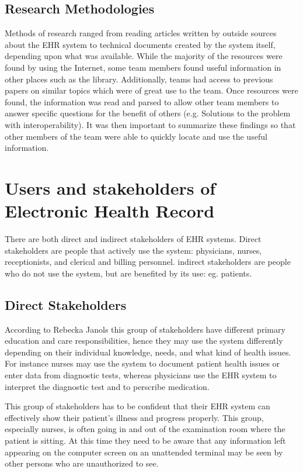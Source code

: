 \documentclass[14pt]{article}
\begin{document}
\subsection{Research Methodologies }
Methods of research ranged from reading articles written by outside sources about the EHR system to technical documents created by the system itself, depending upon what was available.  While the majority of the resources were found by using the Internet, some team members found useful information in other places such as the library.  Additionally, teams had access to previous papers on similar topics which were of great use to the team.  Once resources were found, the information was read and parsed to allow other team members to answer specific questions for the benefit of others (e.g. Solutions to the problem with interoperability).  It was then important to summarize these findings so that other members of the team were able to quickly locate and use the useful information.

\newpage

\section{Users and stakeholders of Electronic Health Record}
\label{sec:People}
There are both direct and indirect stakeholders of EHR systems. Direct stakeholders are people that actively use the system: physicians, nurses, receptionists, and clerical and billing personnel. indirect stakeholders are people who do not use the system, but are benefited by its use: eg. patients.

\subsection{Direct Stakeholders}
\label{sec:peopleDirect}
According to Rebecka Janols \cite{Janols} this group of stakeholders have different primary education and care responsibilities, hence they may use the system differently depending on their individual knowledge, needs, and what kind of health issues. For instance nurses may use the system to document patient health issues or enter data from diagnostic tests, whereas physicians use the EHR system to interpret the diagnostic test and to perscribe medication. 

This group of stakeholders has to be confident that their EHR system can effectively show their patient’s illness and progress properly. This group, especially nurses, is often going in and out of the examination room where the patient is sitting. At this time they need to be aware that any information left appearing on the computer screen on an unattended terminal may be seen by other persons who are unauthorized to see. 
\end{document}

